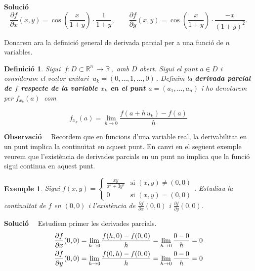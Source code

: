 \documentclass[12pt]{article}
\newcommand{\observacio}{\textbf{Observaci{\'o}}\ \ }
\newcommand{\solucio}{\textbf{Soluci{\'o}}\ \ }
\newtheorem{definicio}{Definici{\'o}}[subsection]
\newtheorem{exemple}{Exemple}[subsection]
\newcommand{\R}{\mathbb{R}}
\begin{document}
\solucio
\[
\frac{\partial f}{\partial x}(x,y)=\cos\left(\frac{x}{1+y} \right)
\cdot \frac{1}{1+y}, \quad\quad \frac{\partial f}{\partial
y}(x,y)=\cos\left(\frac{x}{1+y} \right) \cdot \frac{-x}{(1+y)^{2}}.
\]

\vspace{0.4cm}
Donarem ara la definici{\'o} general de derivada parcial per a una funci{\'o} de $n$ variables.

\vspace{0.4cm}
\begin{definicio}
Sigui $\ f:D\subset\R^n\, \longrightarrow\R\,,$ amb  $D$ obert. Sigui
el punt $a\in D$ i consideram el vector unitari $\ u_k =(0,\ldots,  1,\ldots ,0)\,.$
Definim la \textbf{derivada parcial de $f$ respecte de la variable $x_k$ en el punt $a=(a_1,\ldots,a_n)$} i ho denotarem per $f_{x_k}(a)\ $ com

$$
f_{x_k}(a)=\lim_{h\to 0} \frac{f(a+h\, u_k)-f(a)}{h}
$$
\end{definicio}

\vspace{0.4cm}
\observacio
Recordem que en funcions d'una variable real, la derivabilitat en un punt implica la
continu{\"\i}tat en aquest punt. En canvi en el seg{\"u}ent exemple veurem que l'exist{\`e}ncia de derivades
parcials en un punt no implica que la funci{\'o} sigui continua en aquest punt.

\vspace{0.4cm}\begin{exemple}
Sigui $f(x,y)=  \begin{cases}
                       \frac{xy}{x^{2}+3y^{2} }&
\text{si} \,\, (x,y) \neq (0,0)
                        \\
                       0                      &
\text{si} \,\, (x,y) = (0,0)
                    \end{cases}$.
Estudiau la continu{\"\i}tat de $f$ en $(0,0)$ i l'exist{\`e}ncia de
$\frac{\partial f}{\partial x}(0,0)$ i $\frac{\partial f}{\partial
y}(0,0)$.
\end{exemple}

\solucio
Estudiem primer les derivades parcials.
\vspace{0.4cm}
\begin{equation*}
\vspace{0.4cm}\begin{split}
\frac{\partial f}{\partial x}(0,0) & = \lim_{h\to 0}
\frac{f(h,0)-f(0,0)}{h} = \lim_{h\to 0} \frac{0-0}{h} = 0 \\
\frac{\partial f}{\partial y}(0,0) & = \lim_{h\to 0}
\frac{f(0,h)-f(0,0)}{h} = \lim_{h\to 0} \frac{0-0}{h} = 0
\end{split}
\end{equation*}
\end{document}
